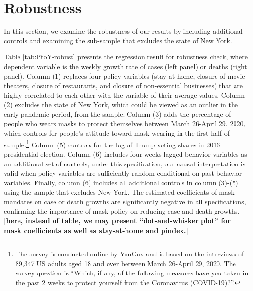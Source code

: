 \documentclass[11pt,reqno,letter]{amsart}
\theoremstyle{definition}
\begin{document}


\maketitle




\section{Robustness}


In this section, we examine the robustness of our results by including additional controls and examining the sub-sample that excludes the state of New York. 

Table \ref{tab:PtoY-robust} presents the regression result for robustness check, where dependent variable is the weekly growth rate of
  cases  (left panel) or deaths (right panel).   Column (1) replaces four policy variables  (stay-at-home, closure of movie theaters, closure of restaurants, and closure of non-essential businesses) that are highly correlated to each other with the variable of their average values. Column (2) excludes the state of New York, which could be viewed as an outlier in the early pandemic period, from the sample.
 Column (3) adds the percentage of people who wears masks to protect themselves between March 26-April 29, 2020, which controls for people's attitude toward mask wearing in the first half of sample.\footnote{ The survey is conducted online by YouGov and is based on the interviews of 89,347 US adults aged 18 and over between March 26-April 29, 2020.  The survey question is ``Which, if any, of the following measures have you taken in the past 2 weeks to protect yourself from the Coronavirus (COVID-19)?''.}  Column (5) controls for the log of Trump voting shares in 2016 presidential election. Column (6) includes four weeks lagged behavior variables as an additional set of controls; under this specification, our causal interpretation is valid when policy variables are sufficiently random conditional on past behavior variables. Finally, column (6) includes all additional controls in column (3)-(5) using the sample that excludes New York.   The estimated coefficients of mask mandates on case or death growths are significantly negative in all specifications, confirming the importance of mask policy on reducing case and death growths.  \textbf{[here, instead of table, we may present ``dot-and-whisker plot'' for mask coefficients as well as stay-at-home and pindex.]}
  
\end{document}
